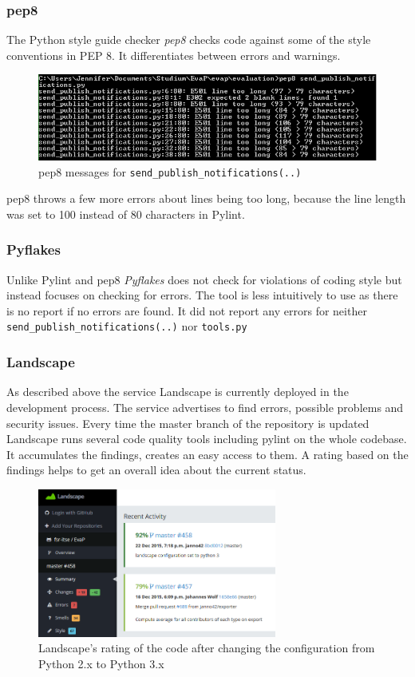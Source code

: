 \subsubsection{pep8}
The Python style guide checker \emph{pep8} checks code against some of the style conventions in PEP 8.
It differentiates between errors and warnings.
\begin{figure}[h]
    \centering
    \includegraphics[width=\textwidth, keepaspectratio]{graphics/pep8_send_publish_notifications_1}
    \caption{pep8 messages for \texttt{send\_publish\_notifications(..)}}
    \label{fig:pep8}
\end{figure} 
pep8 throws a few more errors about lines being too long, because the line length was set to 100 instead of 80 characters in Pylint.

\subsubsection{Pyflakes}
Unlike Pylint and pep8 \emph{Pyflakes} does not check for violations of coding style but instead focuses on checking for errors.
The tool is less intuitively to use as there is no report if no errors are found. 
It did not report any errors for neither \texttt{send\_publish\_notifications(..)} nor \texttt{tools.py}

\subsubsection{Landscape}
As described above the service Landscape is currently deployed in the development process. 
The service advertises to find errors, possible problems and security issues.
Every time the master branch of the repository is updated Landscape runs several code quality tools including pylint on the whole codebase. 
It accumulates the findings, creates an easy access to them.
A rating based on the findings helps to get an overall idea about the current status.

\begin{figure}[h]
    \centering
    \includegraphics[width=0.7\textwidth, keepaspectratio]{graphics/landscape_python3}
    \caption{Landscape's rating of the code after changing the configuration from Python 2.x to Python 3.x}
    \label{fig:landscape_Python3}
\end{figure} 

